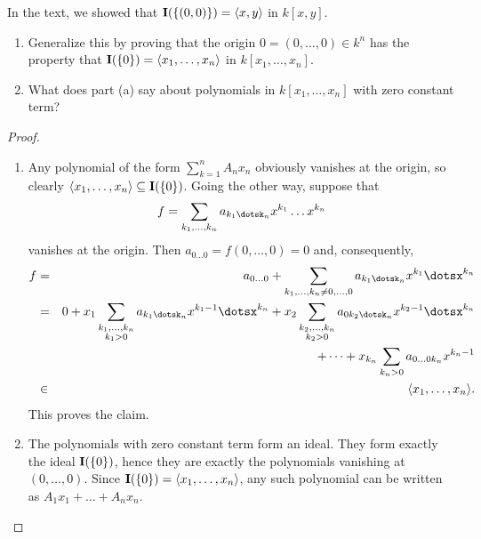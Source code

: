 \begin{exercise}{18}
In the text, we showed that $\mathbf{I}(\{(0,0)\}) = \langle x,y\rangle$ in $k[x,y]$.
\begin{enumerate}
    \item Generalize this by proving that the origin $0 = (0,\dots,0)\in k^n$ has the property that $\mathbf{I}(\{0\}) = \langle x_1,\dots,x_n\rangle$ in $k[x_1,\dots,x_n]$.
    \item What does part (a) say about polynomials in $k[x_1,\dots,x_n]$ with zero constant term?
\end{enumerate}
\end{exercise}
\begin{proof}
    \begin{enumerate}
        \item Any polynomial of the form $\sum_{k=1}^n A_n x_n$ obviously vanishes at the origin, so clearly $\langle x_1,\dots,x_n\rangle \subseteq \mathbf{I}(\{0\})$. Going the other way, suppose that
        $$f = \sum_{k_1,\dots,k_n} a_{k_1\dotsk_n} x^{k_1} \dots x^{k_n}$$
        vanishes at the origin. Then $a_{0\dots0} = f(0,\dots,0) = 0$ and, consequently,
        \begin{eqnarray*}
            f
            & = & a_{0\dots0} + \sum_{k_1,\dots,k_n\neq 0,\dots,0} a_{k_1\dotsk_n} x^{k_1}\dotsx^{k_n}\\
            & = & 0 + x_1 \sum_{\substack{k_1,\dots,k_n\\ k_1>0}} a_{k_1\dotsk_n} x^{k_1-1}\dotsx^{k_n} + x_2\sum_{\substack{k_2,\dots,k_n\\ k_2 > 0}} a_{0 k_2\dotsk_n} x^{k_2 - 1}\dotsx^{k_n}\\
            & & + \dots + x_{k_n}\sum_{k_n>0} a_{0\dots0k_n} x^{k_n - 1}\\
            & \in & \langle x_1,\dots,x_n\rangle.
        \end{eqnarray*}
        This proves the claim.
        \item The polynomials with zero constant term form an ideal. They form exactly the ideal $\mathbf{I}(\{0\})$, hence they are exactly the polynomials vanishing at $(0,\dots,0)$. Since $\mathbf{I}(\{0\}) = \langle x_1,\dots,x_n\rangle$, any such polynomial can be written as $A_1 x_1 + \dots + A_n x_n$.
    \end{enumerate}
\end{proof}

